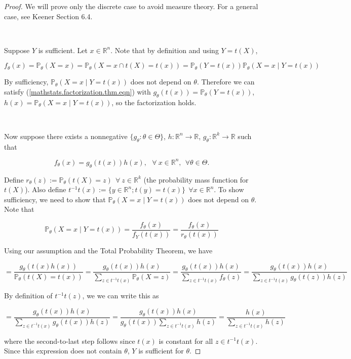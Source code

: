 \begin{proof} We will prove only the discrete case to avoid measure theory. For a general case, see Keener Section 6.4. 

\

Suppose \(Y\) is sufficient. Let \(x \in \mathbb{R}^n\). Note that by definition and using \(Y = t(X)\),

\[
f_\theta(x) = \mathbb{P}_\theta (X = x) = \mathbb{P}_\theta (X = x \cap t(X) = t(x)) = \mathbb{P}_\theta ( Y = t(x))   \mathbb{P}_\theta (X = x \mid Y = t(x)) 
\]

By sufficiency, \( \mathbb{P}_\theta (X = x \mid Y = t(x)) \) does not depend on \(\theta\). Therefore we can satisfy (\ref{mathstats.factorization.thm.eqn}) with \(g_\theta(t(x)) = \mathbb{P}_\theta ( Y = t(x))  \), \(h(x) = \mathbb{P}_\theta (X = x \mid Y = t(x))  \), so the factorization holds.

\

Now suppose there exists a nonnegative \(\{g_\theta: \theta \in \Theta\}\), \(h: \mathbb{R}^n \to \mathbb{R}\), \(g_\theta: \mathbb{R}^k \to \mathbb{R}\) such that

\[
f_\theta(x) = g_\theta(t(x)) h(x), \ \ \ \forall \ x \in \mathbb{R}^n, \ \ \forall \theta \in \Theta.
\]

Define \(r_\theta(z) := \mathbb{P}_\theta(t(X) = z)  \ \ \forall \ z \in \mathbb{R}^k\) (the probability mass function for \(t(X)\)).  Also define \(t^{-1} t(x) := \{y \in \mathbb{R}^n; t(y) = t(x) \} \ \ \forall x \in \mathbb{R}^n\). To show sufficiency, we need to show that \(\mathbb{P}_\theta (X = x \mid Y = t(x))\) does not depend on \(\theta\). Note that

\[
\mathbb{P}_\theta (X = x \mid Y = t(x)) = \frac{f_\theta(x)}{f_Y(t(x))}= \frac{f_\theta(x)}{r_\theta(t(x))}
\]

Using our assumption and the Total Probability Theorem, we have

\[
= \frac{ g_\theta(t(x) h(x))}{\mathbb{P}_\theta(t(X) = t(x))} = \frac{ g_\theta(t(x)) h(x)}{\sum_{z \in t^{-1} t(x)} \mathbb{P}_\theta (X = z)} = \frac{ g_\theta(t(x)) h(x)}{\sum_{z \in t^{-1} t(x)} f_\theta(z)}  = \frac{ g_\theta(t(x)) h(x)}{\sum_{z \in t^{-1} t(x)}  g_\theta(t(z)) h(z) }
\]

By definition of \(t^{-1}t(z)\), we we can write this as

\[
= \frac{ g_\theta(t(x)) h(x)}{\sum_{z \in t^{-1} t(x)}  g_\theta(t(x)) h(z) }= \frac{ g_\theta(t(x)) h(x)}{g_\theta(t(x))\sum_{z \in t^{-1} t(x)}   h(z) }  = \frac{  h(x)}{\sum_{z \in t^{-1} t(x)}   h(z) }
\]

where the second-to-last step follows since \(t(x)\) is constant for all \(z \in t^{-1} t(x)\). Since this expression does not contain \(\theta\), \(Y\) is sufficient for \(\theta\).

\end{proof}

